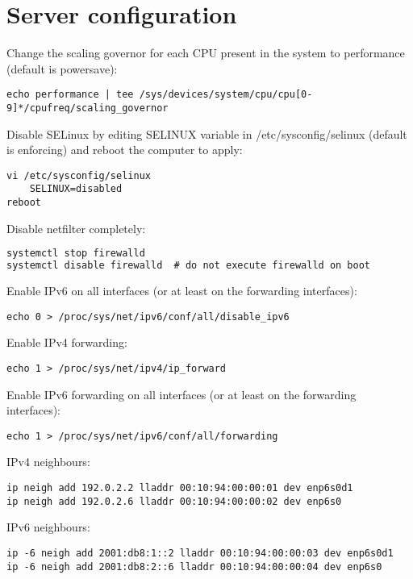 
\section{Server configuration}
Change the scaling governor for each CPU present in the system to performance (default is powersave):
\begin{lstlisting}
echo performance | tee /sys/devices/system/cpu/cpu[0-9]*/cpufreq/scaling_governor
\end{lstlisting}
Disable SELinux by editing SELINUX variable in /etc/sysconfig/selinux
(default is enforcing) and reboot the computer to apply:
\begin{lstlisting}
vi /etc/sysconfig/selinux
	SELINUX=disabled
reboot
\end{lstlisting}
Disable netfilter completely:
\begin{lstlisting}[language=TeX]
systemctl stop firewalld
systemctl disable firewalld  # do not execute firewalld on boot
\end{lstlisting}
Enable IPv6 on all interfaces (or at least on the forwarding interfaces):
\begin{lstlisting}
echo 0 > /proc/sys/net/ipv6/conf/all/disable_ipv6
\end{lstlisting}
Enable IPv4 forwarding:
\begin{lstlisting}
echo 1 > /proc/sys/net/ipv4/ip_forward
\end{lstlisting}
Enable IPv6 forwarding on all interfaces (or at least on the forwarding interfaces):
\begin{lstlisting}
echo 1 > /proc/sys/net/ipv6/conf/all/forwarding
\end{lstlisting}

IPv4 neighbours:
\begin{lstlisting}
ip neigh add 192.0.2.2 lladdr 00:10:94:00:00:01 dev enp6s0d1
ip neigh add 192.0.2.6 lladdr 00:10:94:00:00:02 dev enp6s0
\end{lstlisting}
IPv6 neighbours:
\begin{lstlisting}
ip -6 neigh add 2001:db8:1::2 lladdr 00:10:94:00:00:03 dev enp6s0d1
ip -6 neigh add 2001:db8:2::6 lladdr 00:10:94:00:00:04 dev enp6s0
\end{lstlisting}

